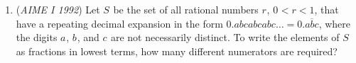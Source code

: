 \begin{enumerate}
 
 \[\begin{array}{c@{\hspace{8em}} c@{\hspace{6pt}}c@{\hspace{6pt}}c@{\hspace{6pt}}c@{\hspace{4pt}}c@{\hspace{2pt}} c@{\hspace{2pt}}c@{\hspace{2pt}}c@{\hspace{2pt}}c@{\hspace{3pt}}c@{\hspace{6pt}} c@{\hspace{6pt}}c@{\hspace{6pt}}c} \vspace{4pt} \text{Row 0: } &    &    &     &     &    &    & 1 &     &     &    &    &    &  \\\vspace{4pt} \text{Row 1: } &    &    &     &     &    & 1 &    & 1  &     &    &    &    &  \\\vspace{4pt} \text{Row 2: } &    &    &     &     & 1 &    & 2 &     & 1  &    &    &    &  \\\vspace{4pt} \text{Row 3: } &    &    &     &  1 &    & 3 &    & 3  &     & 1 &    &    &  \\\vspace{4pt} \text{Row 4: } &    &    & 1  &     & 4 &    & 6 &     & 4  &    & 1 &    &  \\\vspace{4pt} \text{Row 5: } &    & 1 &     & 5  &    &10&    &10 &     & 5 &    & 1 &  \\\vspace{4pt} \text{Row 6: } & 1 &    & 6  &     &15&    &20&     &15 &    & 6 &    & 1 \end{array}\]In which row of Pascal's Triangle do three consecutive entries occur that are in the ratio $3: 4: 5$? 


 

	\item (\textit{AIME I 1992}) Let $S^{}_{}$ be the set of all rational numbers $r^{}_{}$, $0^{}_{}<r<1$, that have a repeating decimal expansion in the form $0.abcabcabc\ldots=0.\overline{abc}$, where the digits $a^{}_{}$, $b^{}_{}$, and $c^{}_{}$ are not necessarily distinct. To write the elements of $S^{}_{}$ as fractions in lowest terms, how many different numerators are required?



\end{enumerate}
